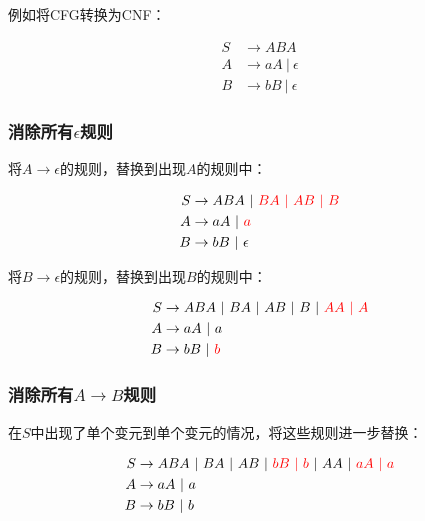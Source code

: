 例如将CFG转换为CNF：

\vspace{-1cm}

\begin{align*}
    S & \rightarrow ABA             \\
    A & \rightarrow aA\ |\ \epsilon \\
    B & \rightarrow bB\ |\ \epsilon
\end{align*}

\subsubsection{消除所有$ \epsilon $规则}

将$ A \rightarrow \epsilon $的规则，替换到出现$ A $的规则中：

\vspace{-1cm}

\begin{align*}
    S & \rightarrow ABA\ |\ \textcolor{red}{BA\ |\ AB\ |\ B} \\
    A & \rightarrow aA\ |\ \textcolor{red}{a}                \\
    B & \rightarrow bB\ |\ \epsilon
\end{align*}

将$ B \rightarrow \epsilon $的规则，替换到出现$ B $的规则中：

\vspace{-1cm}

\begin{align*}
    S & \rightarrow ABA\ |\ BA\ |\ AB\ |\ B\ |\ \textcolor{red}{AA\ |\ A} \\
    A & \rightarrow aA\ |\ a                                              \\
    B & \rightarrow bB\ |\ \textcolor{red}{b}
\end{align*}

\subsubsection{消除所有$ A \rightarrow B $规则}

在$ S $中出现了单个变元到单个变元的情况，将这些规则进一步替换：

\vspace{-1cm}

\begin{align*}
    S & \rightarrow ABA\ |\ BA\ |\ AB\ |\ \textcolor{red}{bB\ |\ b}\ |\ AA\ |\ \textcolor{red}{aA\ |\ a} \\
    A & \rightarrow aA\ |\ a                                                                             \\
    B & \rightarrow bB\ |\ b
\end{align*}

